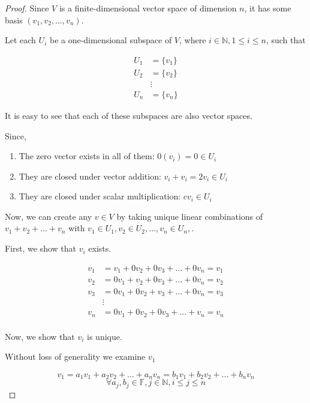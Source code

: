 \documentclass[12pt,letterpaper]{article}
\begin{document}
\begin{enumerate}
      \begin{proof}
        Since $V$ is a finite-dimensional vector space of dimension $n$,
        it has some basis $(v_1, v_2, ..., v_n)$.

        Let each $U_i$ be a one-dimensional subspace of $V$, where $i \in \mathbb{N}, 1 \le i \le n$, such that

        \begin{align*}
          U_1 &= \{v_1\} \\
          U_2 &= \{v_2\} \\
          &\vdots \\
          U_n &= \{v_n\}
        \end{align*}

        It is easy to see that each of these subspaces are also vector spaces.

        Since,
          \begin{enumerate}
            \item The zero vector exists in all of them: $0(v_i) = 0 \in U_i$
            \item They are closed under vector addition: $v_i + v_i = 2v_i \in U_i$
            \item They are closed under scalar multiplication: $cv_i \in U_i $
          \end{enumerate}

        Now, we can create any $v \in V$ by taking unique linear combinations of $v_1 + v_2 + ... + v_n$ with $v_1 \in U_1, v_2 \in U_2, ..., v_n \in U_n,$.

        First, we show that $v_i$ exists.

        \begin{align*}
          v_1 &= v_1 + 0v_2 + 0v_3 + ... + 0v_n = v_1 \\
          v_2 &= 0v_1 + v_2 + 0v_3 + ... + 0v_n = v_2 \\
          v_3 &= 0v_1 + 0v_2 + v_3 + ... + 0v_n = v_3 \\
          & \vdots \\
          v_n &= 0v_1 + 0v_2 + 0v_3 + ... + v_n = v_n \\
        \end{align*}

        Now, we show that $v_i$ is unique.

        Without loss of generality we examine $v_1$

        \[v_1 = a_1v_1 + a_2v_2 + ... + a_nv_n = b_1v_1 + b_2v_2 + ... + b_nv_n\]
        \[\forall a_j, b_j \in \mathbb{F}, j \in \mathbb{N}, i \le j \le n\]
        

\end{proof}
\end{enumerate}
\end{document}
